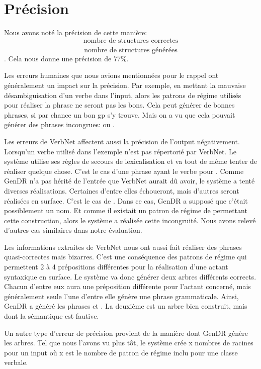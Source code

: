 \section{Précision}

Nous avons noté la précision de cette manière:\[\frac{\text{nombre de structures correctes}}{\text{nombre de structures générées}}\]. Cela nous donne une précision de 77\%.

Les erreurs humaines que nous avions mentionnées pour le rappel ont généralement un impact sur la précision. Par exemple, en mettant la mauvaise désambiguisation d'un verbe dans l'input, alors les patrons de régime utilisés pour réaliser la phrase ne seront pas les bons. Cela peut générer de bonnes phrases, si par chance un bon gp s'y trouve. Mais on a vu que cela pouvait générer des phrases incongrues:  ou .

Les erreurs de VerbNet affectent aussi la précision de l'output négativement. Lorsqu'un verbe utilisé dans l'exemple n'est pas répertorié par VerbNet. Le système utilise ses règles de secours de lexicalisation et va tout de même tenter de réaliser quelque chose. C'est le cas d'une phrase ayant le verbe  pour . Comme GenDR n'a pas hérité de l'entrée que VerbNet aurait dû avoir, le système a tenté diverses réalisations. Certaines d'entre elles échoueront, mais d'autres seront réalisées en surface. C'est le cas de . Dans ce cas, GenDR a supposé que c'était possiblement un nom. Et comme il existait un patron de régime de  permettant cette construction, alors le système a réalisée cette incongruité. Nous avons relevé d'autres cas similaires dans notre évaluation.

Les informations extraites de VerbNet nous ont aussi fait réaliser des phrases quasi-correctes mais bizarres. C'est une conséquence des patrons de régime qui permettent 2 à 4 prépositions différentes pour la réalisation d'une actant syntaxique en surface. Le système va donc générer deux arbres différents corrects. Chacun d'entre eux aura une préposition différente pour l'actant concerné, mais généralement seule l'une d'entre elle génère une phrase grammaticale. Ainsi, GenDR a généré les phrases  et . La deuxième est un arbre bien construit, mais dont la sémantique est fautive.

Un autre type d'erreur de précision provient de la manière dont GenDR génère les arbres. Tel que nous l'avons vu plus tôt, le système crée x nombres de racines pour un input où x est le nombre de patron de régime inclu pour une classe verbale. 


